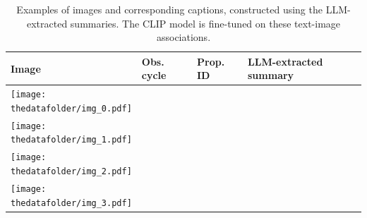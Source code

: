 \documentclass[10pt]{article} %
\begin{document}
\begin{table}[h!]
      \centering
      \begin{tabular}{m{} p{1.9cm} p{1.9cm} m{8cm}}
          \toprule
          \centering \bfseries Image & \centering \bfseries Obs. cycle & \centering \bfseries Prop. ID & \centering \bfseries LLM-extracted summary \tabularnewline
          \midrule
          \centering \texttt{[image: \\thedatafolder/img\_0.pdf]} & \centering  & \centering  &  {\scriptsize } \tabularnewline
          \midrule
          \centering \texttt{[image: \\thedatafolder/img\_1.pdf]} & \centering  & \centering  &  {\scriptsize } \tabularnewline
          \midrule
          \centering \texttt{[image: \\thedatafolder/img\_2.pdf]} & \centering  & \centering  &  {\scriptsize } \tabularnewline
          \midrule
          \centering \texttt{[image: \\thedatafolder/img\_3.pdf]} & \centering  & \centering  &  {\scriptsize } \tabularnewline
          \bottomrule
      \end{tabular}
      \caption{Examples of images and corresponding captions, constructed using the LLM-extracted summaries. The CLIP model is fine-tuned on these text-image associations.}
      \label{tab:dataset}
  \end{table}
\end{document}
